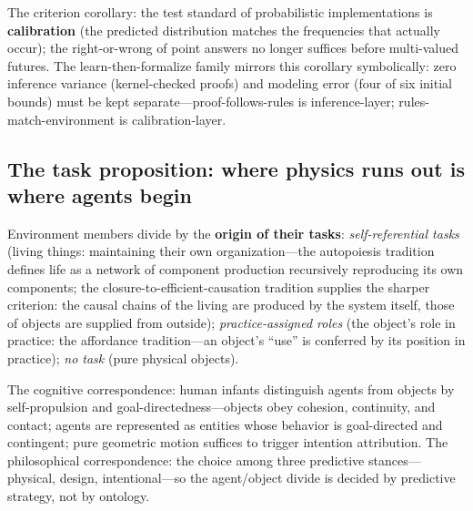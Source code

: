 \documentclass[10pt]{article}
\begin{document}
The criterion corollary: the test standard of probabilistic implementations is \textbf{calibration} (the predicted distribution matches the frequencies that actually occur); the right-or-wrong of point answers no longer suffices before multi-valued futures. The learn-then-formalize family mirrors this corollary symbolically: zero inference variance (kernel-checked proofs) and modeling error (four of six initial bounds) must be kept separate---proof-follows-rules is inference-layer; rules-match-environment is calibration-layer.

\subsection{The task proposition: where physics runs out is where agents begin}\label{sec:task}

Environment members divide by the \textbf{origin of their tasks}: \emph{self-referential tasks} (living things: maintaining their own organization---the autopoiesis tradition defines life as a network of component production recursively reproducing its own components\cite{varela1974}; the closure-to-efficient-causation tradition supplies the sharper criterion: the causal chains of the living are produced by the system itself, those of objects are supplied from outside\cite{rosen1991}); \emph{practice-assigned roles} (the object's role in practice: the affordance tradition---an object's ``use'' is conferred by its position in practice); \emph{no task} (pure physical objects).

The cognitive correspondence: human infants distinguish agents from objects by self-propulsion and goal-directedness---objects obey cohesion, continuity, and contact; agents are represented as entities whose behavior is goal-directed and contingent\cite{spelke2007core}; pure geometric motion suffices to trigger intention attribution\cite{heider1944}. The philosophical correspondence: the choice among three predictive stances---physical, design, intentional\cite{dennett1987}---so the agent/object divide is decided by predictive strategy, not by ontology.
\end{document}
